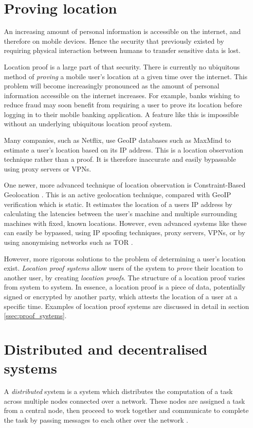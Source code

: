 \section{Proving location}
An increasing amount of personal information is accessible on the internet, and therefore on mobile devices. Hence the security that previously existed by requiring physical interaction between humans to transfer sensitive data is lost.

Location proof is a large part of that security. There is currently no ubiquitous method of \textit{proving} a mobile user's location at a given time over the internet. This problem will become increasingly pronounced as the amount of personal information accessible on the internet increases. For example, banks wishing to reduce fraud may soon benefit from requiring a user to prove its location before logging in to their mobile banking application. A feature like this is impossible without an underlying ubiquitous location proof system.

Many companies, such as Netflix, use GeoIP databases such as MaxMind \cite{maxmind} to estimate a user's location based on its IP address. This is a location observation technique rather than a proof. It is therefore inaccurate and easily bypassable using proxy servers or VPNs.

One newer, more advanced technique of location observation is Constraint-Based Geolocation \cite{constraint-based}. This is an active geolocation technique, compared with GeoIP verification which is static. It estimates the location of a users IP address by calculating the latencies between the user's machine and multiple surrounding machines with fixed, known locations. However, even advanced systems like these can easily be bypassed, using IP spoofing techniques, proxy servers, VPNs, or by using anonymising networks such as TOR \cite{tor}.

However, more rigorous solutions to the problem of determining a user's location exist. \textit{Location proof systems} allow users of the system to \textit{prove} their location to another user, by creating \textit{location proofs}. The structure of a location proof varies from system to system. In essence, a location proof is a piece of data, potentially signed or encrypted by another party, which attests the location of a user at a specific time. Examples of location proof systems are discussed in detail in section \ref{ssec:proof_systems}.

\section{Distributed and decentralised systems}
A \textit{distributed} system is a system which distributes the computation of a task across multiple nodes connected over a network. These nodes are assigned a task from a central node, then proceed to work together and communicate to complete the task by passing messages to each other over the network \cite{distributed}.

